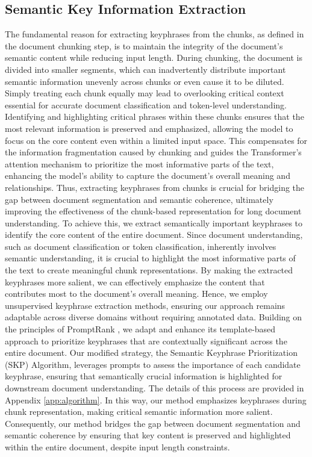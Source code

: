 \documentclass[11pt]{article}
\begin{document}
\subsection{Semantic Key Information Extraction}
The fundamental reason for extracting keyphrases from the chunks, as defined in the document chunking step, is to maintain the integrity of the document's semantic content while reducing input length. During chunking, the document is divided into smaller segments, which can inadvertently distribute important semantic information unevenly across chunks or even cause it to be diluted. Simply treating each chunk equally may lead to overlooking critical context essential for accurate document classification and token-level understanding.
Identifying and highlighting critical phrases within these chunks ensures that the most relevant information is preserved and emphasized, allowing the model to focus on the core content even within a limited input space. This compensates for the information fragmentation caused by chunking and guides the Transformer’s attention mechanism to prioritize the most informative parts of the text, enhancing the model’s ability to capture the document’s overall meaning and relationships. Thus, extracting keyphrases from chunks is crucial for bridging the gap between document segmentation and semantic coherence, ultimately improving the effectiveness of the chunk-based representation for long document understanding.
To achieve this, we extract semantically important keyphrases to identify the core content of the entire document. Since document understanding, such as document classification or token classification, inherently involves semantic understanding, it is crucial to highlight the most informative parts of the text to create meaningful chunk representations. By making the extracted keyphrases more salient, we can effectively emphasize the content that contributes most to the document’s overall meaning. Hence, we employ unsupervised keyphrase extraction methods, ensuring our approach remains adaptable across diverse domains without requiring annotated data. Building on the principles of PromptRank \citep{kong-etal-2023-promptrank}, we adapt and enhance its template-based approach to prioritize keyphrases that are contextually significant across the entire document. Our modified strategy, the Semantic Keyphrase Prioritization (SKP) Algorithm, leverages prompts to assess the importance of each candidate keyphrase, ensuring that semantically crucial information is highlighted for downstream document understanding. The details of this process are provided in Appendix \ref{app:algorithm}. In this way, our method emphasizes keyphrases during chunk representation, making critical semantic information more salient. Consequently, our method bridges the gap between document segmentation and semantic coherence by ensuring that key content is preserved and highlighted within the entire document, despite input length constraints.
\end{document}
